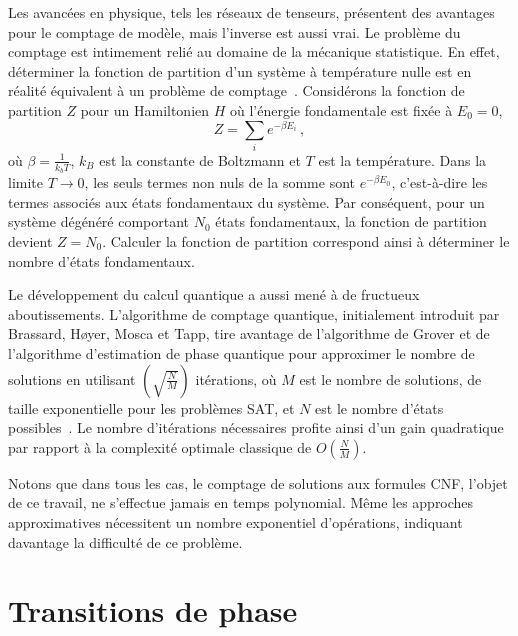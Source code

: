 Les avancées en physique, tels les réseaux de tenseurs, présentent des avantages pour le comptage de modèle, mais l'inverse est aussi vrai. Le problème du comptage est intimement relié au domaine de la mécanique statistique. En effet, déterminer la fonction de partition d'un système à température nulle est en réalité équivalent à un problème de comptage~\cite{timmeCountingComplexDisordered2009}. Considérons la fonction de partition $Z$ pour un Hamiltonien $H$ où l'énergie fondamentale est fixée à $E_{0} = 0$,
\begin{equation}
    Z = \sum_{i} e^{-\beta E_{i}} \,,
\end{equation}
où $\beta = \frac{1}{k_{b} T}$, $k_{B}$ est la constante de Boltzmann et $T$ est la température. Dans la limite $T \to 0$, les seuls termes non nuls de la somme sont $e^{-\beta E_{0}}$, c'est-à-dire les termes associés aux états fondamentaux du système. Par conséquent, pour un système dégénéré comportant $N_{0}$ états fondamentaux, la fonction de partition devient $Z = N_{0}$. Calculer la fonction de partition correspond ainsi à déterminer le nombre d'états fondamentaux.

Le développement du calcul quantique a aussi mené à de fructueux aboutissements. L'algorithme de comptage quantique, initialement introduit par Brassard, H\o yer, Mosca et Tapp, tire avantage de l'algorithme de Grover et de l'algorithme d'estimation de phase quantique pour approximer le nombre de solutions en utilisant $(\sqrt{\frac{N}{M}})$ itérations, où $M$ est le nombre de solutions, de taille exponentielle pour les problèmes SAT, et $N$ est le nombre d'états possibles~\cite{brassardQuantumAmplitudeAmplification2002, wieSimplerQuantumCounting2019, aaronsonQuantumApproximateCounting2020}. Le nombre d'itérations nécessaires profite ainsi d'un gain quadratique par rapport à la complexité optimale classique de $O(\frac{N}{M})$.

Notons que dans tous les cas, le comptage de solutions aux formules CNF, l'objet de ce travail, ne s'effectue jamais en temps polynomial. Même les approches approximatives nécessitent un nombre exponentiel d'opérations, indiquant davantage la difficulté de ce problème.


\section{Transitions de phase}
\label{sec:transitions-de-phase}

